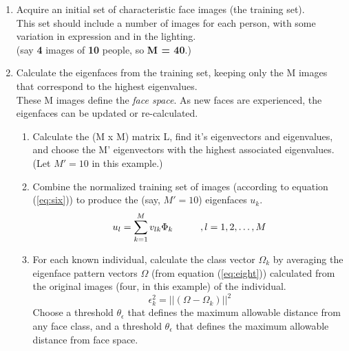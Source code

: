 \documentclass[conference]{IEEEtran}
\begin{document}
\begin{enumerate}
  \item Acquire an initial set of characteristic face images (the training set). \\
        This set should include a number of images for each person, with some
        variation in expression and in the lighting. \\
        (say \textbf{4} images of \textbf{10} people, so \textbf{M = 40}.)
  \item Calculate the eigenfaces from the training set, keeping only the M images
        that correspond to the highest eigenvalues. \\
        These M images define the \textit{face space}. As new faces are experienced,
        the eigenfaces can be updated or re-calculated.
        \begin{enumerate}
          \item Calculate the (M x M) matrix L, find it's eigenvectors and
                eigenvalues, and choose the M' eigenvectors with the highest
                associated eigenvalues. \\
                (Let $ M' = 10 $ in this example.)
          \item Combine the normalized training set of images (according to
                equation (\ref{eq:six})) to produce the (say, $ M' = 10 $) eigenfaces $ u_{k} $. \\
                \begin{equation} \label{eq:six}
                  u_{l} = \sum_{k = 1}^{M} v_{lk}\Phi_{k} \hspace{10 mm}, l = 1,2,\ldots,M
                \end{equation}
          \item For each known individual, calculate the class vector $ \Omega_{k} $
                by averaging the eigenface pattern vectors $ \Omega $ (from equation (\ref{eq:eight}))
                calculated from the original images (four, in this example) of the individual. \\
                \begin{equation} \label{eq:eight}
                  \epsilon_{k}^{2} = || (\Omega - \Omega_{k}) ||^{2}
                \end{equation}
                Choose a threshold $ \theta_{\epsilon} $ that defines the maximum
                allowable distance from any face class, and a threshold $ \theta_{\epsilon} $
                that defines the maximum allowable distance from face space.

\end{enumerate}
\end{enumerate}
\end{document}
